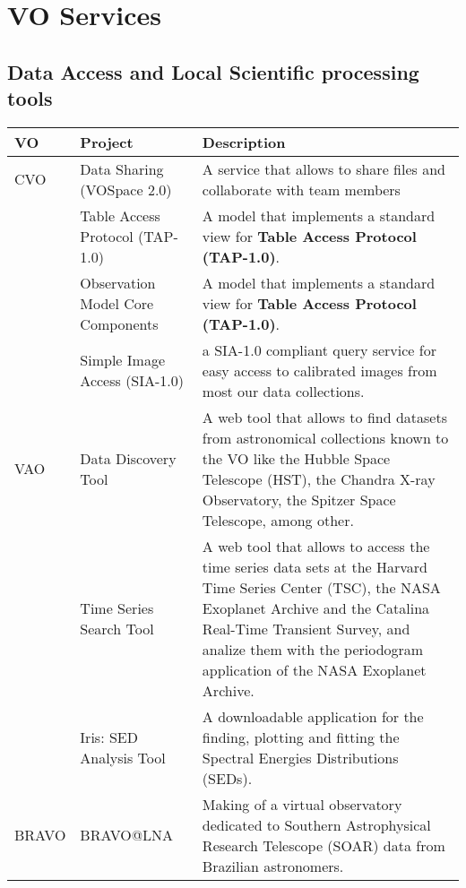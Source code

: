 \section{VO Services}
\subsection{Data Access and Local Scientific processing tools}
\begin{table*}[h!t]
	\centering
	\begin{tabular}{|l|l|p{12.5cm}|}
	\hline
	\textbf{VO} & \textbf{Project} & \textbf{Description}\\
	\hline
	CVO 	& Data Sharing (VOSpace 2.0) &  A service that allows to share files and collaborate with team members \\
			& Table Access Protocol (TAP-1.0) &	A model that implements a standard view for \textbf{Table Access Protocol (TAP-1.0)}. \\
			& Observation Model Core Components & A model that implements a standard view for \textbf{Table Access Protocol (TAP-1.0)}. \\
			& Simple Image Access (SIA-1.0) & a SIA-1.0 compliant query service for easy access to calibrated images from most our data collections. \\
	\hline
	VAO		& Data Discovery Tool & A web tool that allows to find datasets from astronomical collections known to the VO like the Hubble Space Telescope 
									(HST), the Chandra X-ray Observatory, the Spitzer Space Telescope, among other.\\
			& Time Series Search Tool & A web tool that allows to access the time series data sets at the Harvard Time Series Center (TSC), the NASA 
									Exoplanet Archive and the Catalina Real-Time Transient Survey, and analize them with the periodogram application 
									of the NASA Exoplanet Archive.\\
			& Iris: SED Analysis Tool & A downloadable application for the finding, plotting and fitting the 
			Spectral Energies Distributions (SEDs). \\
	\hline
	BRAVO	& BRAVO@LNA & Making of a virtual observatory dedicated to Southern Astrophysical Research Telescope (SOAR) data from Brazilian astronomers.  \\

\end{tabular}
\end{table*}
